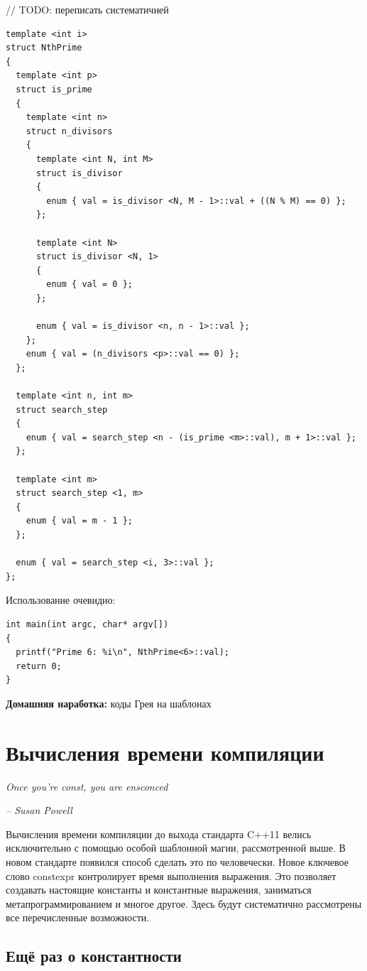 \documentclass[a4paper,12pt,oneside]{book}
\begin{document}
// TODO: переписать систематичней

\begin{lstlisting}
template <int i>
struct NthPrime
{
  template <int p>
  struct is_prime
  {
    template <int n>
    struct n_divisors
    {
      template <int N, int M>
      struct is_divisor
      {
        enum { val = is_divisor <N, M - 1>::val + ((N % M) == 0) };
      };

      template <int N>
      struct is_divisor <N, 1>
      {
        enum { val = 0 };
      };

      enum { val = is_divisor <n, n - 1>::val };
    };
    enum { val = (n_divisors <p>::val == 0) };
  };

  template <int n, int m>
  struct search_step
  {
    enum { val = search_step <n - (is_prime <m>::val), m + 1>::val };
  };

  template <int m>
  struct search_step <1, m>
  {
    enum { val = m - 1 };
  };

  enum { val = search_step <i, 3>::val };
};
\end{lstlisting}

Использование очевидно:

\begin{lstlisting}
int main(int argc, char* argv[])
{
  printf("Prime 6: %i\n", NthPrime<6>::val);
  return 0;
}
\end{lstlisting}

\textbf{Домашняя наработка:} коды Грея на шаблонах



\pagebreak
\section{Вычисления времени компиляции}

\hfill\textit{Once you're const, you are ensconced}{\vspace{0.5em}}

\hfill\textit{-- Susan Powell}

Вычисления времени компиляции до выхода стандарта C++11 велись исключительно с помощью особой шаблонной магии, рассмотренной выше. В новом стандарте появился способ сделать это по человечески. Новое ключевое слово constexpr контролирует время выполнения выражения. Это позволяет создавать настоящие константы и константные выражения, заниматься метапрограммированием и многое другое. Здесь будут систематично рассмотрены все перечисленные возможности.

\subsection{Ещё раз о константности}\label{Constexpr}
\end{document}
